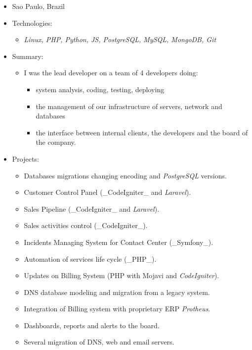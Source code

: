 \documentclass[margin]{res}
\begin{document}
\begin{itemize}

\item
  Sao Paulo, Brazil
\item
  Technologies:

  \begin{itemize}
  
  \item
    \emph{Linux, PHP, Python, JS, PostgreSQL, MySQL, MongoDB, Git}
  \end{itemize}
\item
  Summary:

  \begin{itemize}
  
  \item
    I was the lead developer on a team of 4 developers doing:

    \begin{itemize}
    
    \item
      system analysis, coding, testing, deploying
    \item
      the management of our infrastructure of servers, network and
      databases
    \item
      the interface between internal clients, the developers and the
      board of the company.
    \end{itemize}
  \end{itemize}
\item
  Projects:

  \begin{itemize}
  
  \item
    Databases migrations changing encoding and \emph{PostgreSQL}
    versions.
  \item
    Customer Control Panel (\_CodeIgniter\_ and \emph{Laravel}).
  \item
    Sales Pipeline (\_CodeIgniter\_ and \emph{Laravel}).
  \item
    Sales activities control (\_CodeIgniter\_).
  \item
    Incidents Managing System for Contact Center (\_Symfony\_).
  \item
    Automation of services life cycle (\_PHP\_).
  \item
    Updates on Billing System (PHP with Mojavi and \emph{CodeIgniter}).
  \item
    DNS database modeling and migration from a legacy system.
  \item
    Integration of Billing system with proprietary ERP \emph{Protheus}.
  \item
    Dashboards, reports and alerts to the board.
  \item
    Several migration of DNS, web and email servers.
  \end{itemize}
\end{itemize}
\end{document}
